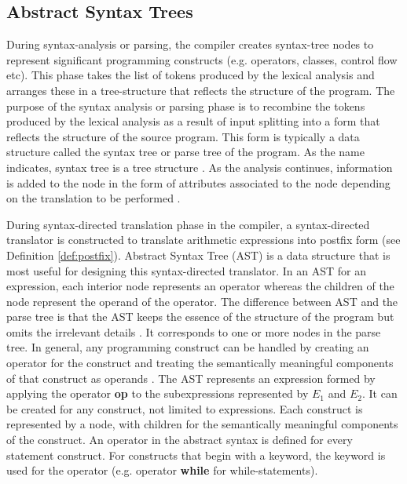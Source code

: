 \subsection{Abstract Syntax Trees}
During syntax-analysis or parsing, the compiler creates syntax-tree nodes to represent significant programming constructs (e.g. operators, classes, control flow etc). This phase takes the list of tokens produced by the lexical analysis and arranges these in a tree-structure that reflects the structure of the program. The purpose of the syntax analysis or parsing phase is to recombine the tokens produced by the lexical analysis as a result of input splitting into a form that reflects the structure of the source program. This form is typically a data structure called the syntax tree or parse tree of the program. As the name indicates, syntax tree is a tree structure \cite{mogensen2009basics}. As the analysis continues, information is added to the node in the form of attributes associated to the node depending on the translation to be performed \cite{lam2006compilers}.

During syntax-directed translation phase in the compiler, a syntax-directed translator is constructed to translate arithmetic expressions into postfix form (see Definition \ref{def:postfix}). Abstract Syntax Tree (AST) is a data structure that is most useful for designing this syntax-directed translator. In an AST for an expression, each interior node represents an operator whereas the children of the node represent the operand of the operator. The difference between AST and the parse tree is that the AST keeps the essence of the structure of the program but omits the irrelevant details \cite{mogensen2009basics}. It corresponds to one or more nodes in the parse tree. In general, any programming construct can be handled by creating an operator for the construct and treating the semantically meaningful components of that construct as operands \cite{lam2006compilers}. The AST represents an expression formed by applying the operator \textbf{op} to the subexpressions represented by $E_{1}$ and $E_{2}$. It can be created for any construct, not limited to expressions. Each construct is represented by a node, with children for the semantically meaningful components of the construct. An operator in the abstract syntax is defined for every statement construct. For constructs that begin with a keyword, the keyword is used for the operator (e.g. operator \textbf{while} for while-statements). 

